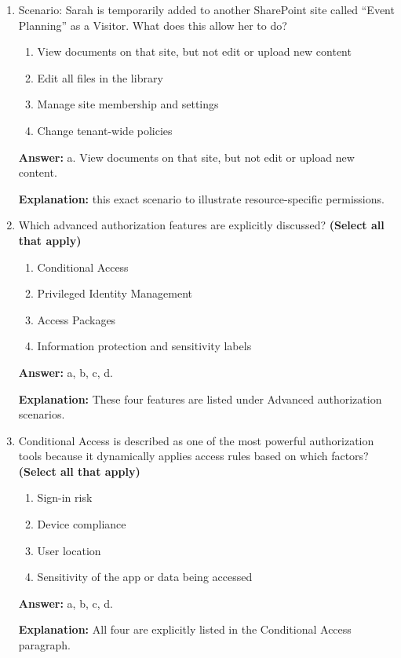 \documentclass[10pt]{article}
\begin{document}
\begin{enumerate}[leftmargin=*]
\textbf{Explanation:} This is the exact example used in the documentation.

\item Scenario: Sarah is temporarily added to another SharePoint site called ``Event Planning'' as a Visitor. What does this allow her to do?
\begin{enumerate}[label=\alph*., leftmargin=1.5em]
\item View documents on that site, but not edit or upload new content
\item Edit all files in the library
\item Manage site membership and settings
\item Change tenant-wide policies
\end{enumerate}
\textbf{Answer:} a. View documents on that site, but not edit or upload new content.

\textbf{Explanation:} this exact scenario to illustrate resource-specific permissions.

\item Which advanced authorization features are explicitly discussed? \textbf{(Select all that apply)}
\begin{enumerate}[label=\alph*., leftmargin=1.5em]
\item Conditional Access
\item Privileged Identity Management
\item Access Packages
\item Information protection and sensitivity labels
\end{enumerate}
\textbf{Answer:} a, b, c, d.

\textbf{Explanation:} These four features are listed under Advanced authorization scenarios.

\item Conditional Access is described as one of the most powerful authorization tools because it dynamically applies access rules based on which factors? \textbf{(Select all that apply)}
\begin{enumerate}[label=\alph*., leftmargin=1.5em]
\item Sign-in risk
\item Device compliance
\item User location
\item Sensitivity of the app or data being accessed
\end{enumerate}
\textbf{Answer:} a, b, c, d.

\textbf{Explanation:} All four are explicitly listed in the Conditional Access paragraph.


\end{enumerate}
\end{document}
